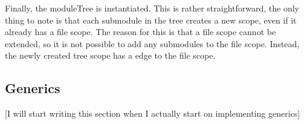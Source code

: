 Finally, the moduleTree is instantiated.
This is rather straightforward, the only thing to note is that each submodule in the tree creates a new scope, even if it already has a file scope.
The reason for this is that a file scope cannot be extended, so it is not possible to add any submodules to the file scope.
Instead, the newly created tree scope has a  edge to the file scope.




\subsection{\label{subsec:solution__statix__generics}Generics}
[I will start writing this section when I actually start on implementing generics]
